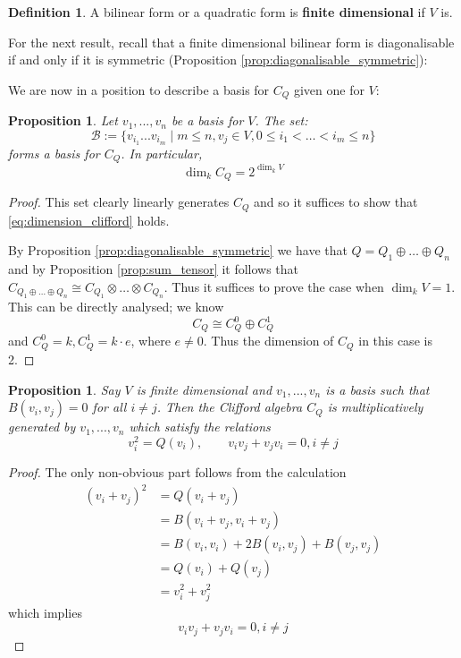 \documentclass[12pt]{article}
\theoremstyle{plain}
\newtheorem{proposition}[thm]{Proposition}
\theoremstyle{definition}
\newtheorem{defn}[thm]{Definition} %
\newcommand{\scr}[1]{\mathscr{#1}}
\begin{document}
\begin{defn}
	A bilinear form or a quadratic form is \textbf{finite dimensional} if $V$ is.
\end{defn}
For the next result, recall that a finite dimensional bilinear form is diagonalisable if and only if it is symmetric (Proposition \ref{prop:diagonalisable_symmetric}):

We are now in a position to describe a basis for $C_Q$ given one for $V$:
\begin{proposition}\label{prop:decomp_even_odd}
	Let $v_1,...,v_n$ be a basis for $V$. The set:
	\begin{equation}
		\scr{B} := \lbrace v_{i_1}...v_{i_m} \mid m \leq n, v_{j} \in V, 0 \leq i_1 < \hdots < i_m \leq n\rbrace
	\end{equation}
	forms a basis for $C_Q$. In particular,
	\begin{equation}\label{eq:dimension_clifford}
		\operatorname{dim}_kC_Q = 2^{\operatorname{dim}_kV}
	\end{equation}
\end{proposition}
\begin{proof}
	This set clearly linearly generates $C_Q$ and so it suffices to show that \eqref{eq:dimension_clifford} holds.
	
	By Proposition \ref{prop:diagonalisable_symmetric} we have that $Q = Q_1 \oplus \hdots \oplus Q_n$ and by Proposition \ref{prop:sum_tensor} it follows that $C_{Q_1 \oplus \hdots \oplus Q_n} \cong C_{Q_1} \otimes \hdots \otimes C_{Q_n}$. Thus it suffices to prove the case when $\operatorname{dim}_kV = 1$. This can be directly analysed; we know
	\begin{equation}
		C_Q \cong C^0_Q \oplus C^1_Q
	\end{equation}
	and $C^0_Q = k, C^1_Q = k\cdot e$, where $e \neq 0$. Thus the dimension of $C_Q$ in this case is 2.
\end{proof}
\begin{proposition}
	Say $V$ is finite dimensional and $v_1,...,v_n$ is a basis such that $B(v_i,v_j) = 0$ for all $i \neq j$. Then the Clifford algebra $C_Q$ is multiplicatively generated by $v_1,...,v_n$ which satisfy the relations
	\begin{equation}\label{eq:clifford_relations}
		v_i^2 = Q(v_i),\qquad v_iv_j + v_jv_i = 0, i \neq j
	\end{equation}
\end{proposition}
\begin{proof}
	The only non-obvious part follows from the calculation
	\begin{align*}
		(v_i + v_j)^2 &= Q(v_i + v_j)\\
		&= B(v_i + v_j, v_i + v_j)\\
		&= B(v_i,v_i) + 2B(v_i,v_j) + B(v_j,v_j)\\
		&= Q(v_i) + Q(v_j)\\
		&= v_i^2 + v_j^2
	\end{align*}
	which implies
	\begin{equation}
		v_iv_j + v_jv_i = 0, i \neq j
	\end{equation}
\end{proof}
\end{document}
